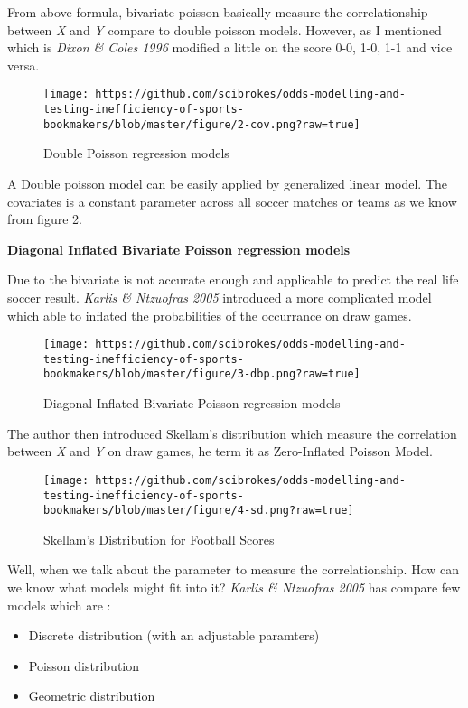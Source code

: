 \documentclass[article]{jss}
\providecommand{\tightlist}{%
  \setlength{\itemsep}{0pt}\setlength{\parskip}{0pt}}
\begin{document}
From above formula, bivariate poisson basically measure the
correlationship between \emph{X} and \emph{Y} compare to double poisson
models. However, as I mentioned which is \emph{Dixon \& Coles 1996}
modified a little on the score 0-0, 1-0, 1-1 and vice versa. \bigbreak

\begin{figure}[htbp]
\centering
\texttt{[image: https://github.com/scibrokes/odds-modelling-and-testing-inefficiency-of-sports-bookmakers/blob/master/figure/2-cov.png?raw=true]}
\caption{Double Poisson regression models}
\end{figure}

A Double poisson model can be easily applied by generalized linear
model. The covariates is a constant parameter across all soccer matches
or teams as we know from figure 2. \bigbreak

\textbf{Diagonal Inflated Bivariate Poisson regression models} \bigbreak

Due to the bivariate is not accurate enough and applicable to predict
the real life soccer result. \emph{Karlis \& Ntzuofras 2005} introduced
a more complicated model which able to inflated the probabilities of the
occurrance on draw games. \bigbreak

\begin{figure}[htbp]
\centering
\texttt{[image: https://github.com/scibrokes/odds-modelling-and-testing-inefficiency-of-sports-bookmakers/blob/master/figure/3-dbp.png?raw=true]}
\caption{Diagonal Inflated Bivariate Poisson regression models}
\end{figure}

The author then introduced Skellam's distribution which measure the
correlation between \emph{X} and \emph{Y} on draw games, he term it as
Zero-Inflated Poisson Model. \bigbreak

\begin{figure}[htbp]
\centering
\texttt{[image: https://github.com/scibrokes/odds-modelling-and-testing-inefficiency-of-sports-bookmakers/blob/master/figure/4-sd.png?raw=true]}
\caption{Skellam's Distribution for Football Scores}
\end{figure}

Well, when we talk about the parameter to measure the correlationship.
How can we know what models might fit into it? \emph{Karlis \& Ntzuofras
2005} has compare few models which are :

\begin{itemize}
\tightlist
\item
  Discrete distribution (with an adjustable paramters)
\item
  Poisson distribution
\item
  Geometric distribution
\end{itemize}
\end{document}
